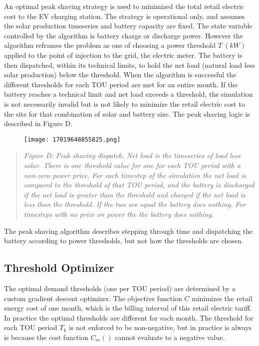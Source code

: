 \documentclass[
]{article}
\begin{document}
An optimal peak shaving strategy is used to minimized the total retail
electric cost to the EV charging station. The strategy is operational
only, and assumes the solar production timeseries and battery capacity
are fixed. The state variable controlled by the algorithm is battery
charge or discharge power. However the algorithm reframes the problem as
one of choosing a power threshold \(T\ (kW)\) applied to the point of
injection to the grid, the electric meter. The battery is then
dispatched, within its technical limits, to hold the net load (natural
load less solar production) below the threshold. When the algorithm is
successful the different thresholds for each TOU period are met for an
entire month. If the battery reaches a technical limit and net load
exceeds a threshold, the simulation is not necessarily invalid but is
not likely to minimize the retail electric cost to the site for that
combination of solar and battery size. The peak shaving logic is
described in Figure D.

\begin{figure}
\centering
\texttt{[image: 17019648855825.png]}
\caption{}
\end{figure}

\begin{quote}
\emph{Figure D: Peak shaving dispatch. Net load is the timeseries of
load less solar. There is one threshold value for one for each TOU
period with a non-zero power price. For each timestep of the simulation
the net load is compared to the threshold of that TOU period, and the
battery is discharged if the net load is greater than the threshold and
charged if the net load is less than the threshold. If the two are equal
the battery does nothing. For timesteps with no price on power the the
battery does nothing.}
\end{quote}

The peak shaving algorithm describes stepping through time and
dispatching the battery according to power thresholds, but not how the
thresholds are chosen.

\hypertarget{threshold-optimizer}{%
\subsection{Threshold Optimizer}\label{threshold-optimizer}}

The optimal demand thresholds (one per TOU period) are determined by a
custom gradient descent optimizer. The objective function \(C\)
minimizes the retail energy cost of one month, which is the billing
interval of this retail electric tariff. In practice the optimal
thresholds are different for each month. The threshold for each TOU
period \(T_k\) is not enforced to be non-negative, but in practice is
always is because the cost function \(C_m()\) cannot evaluate to a
negative value.
\end{document}
